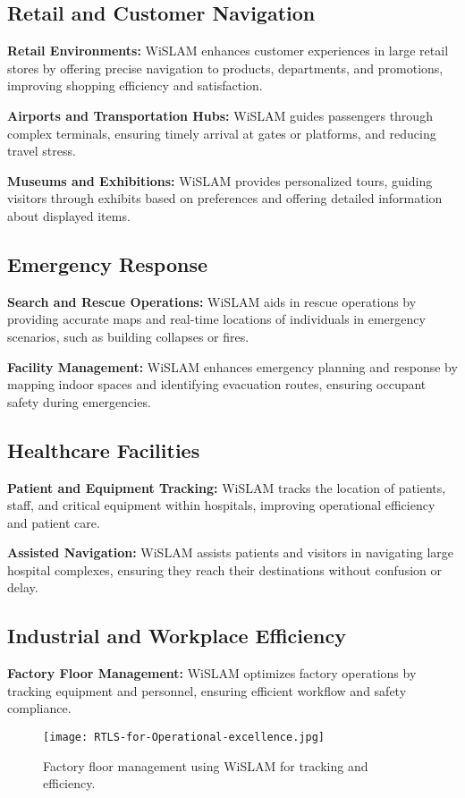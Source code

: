 \documentclass[
	a4paper, %
	11pt, %
	unnumberedsections, %
	twoside, %
]{LTJournalArticle}
\begin{document}
\subsection{Retail and Customer Navigation}
\textbf{Retail Environments:} WiSLAM enhances customer experiences in large retail stores by offering precise navigation to products, departments, and promotions, improving shopping efficiency and satisfaction.

\textbf{Airports and Transportation Hubs:} WiSLAM guides passengers through complex terminals, ensuring timely arrival at gates or platforms, and reducing travel stress.

\textbf{Museums and Exhibitions:} WiSLAM provides personalized tours, guiding visitors through exhibits based on preferences and offering detailed information about displayed items.

\subsection{Emergency Response}
\textbf{Search and Rescue Operations:} WiSLAM aids in rescue operations by providing accurate maps and real-time locations of individuals in emergency scenarios, such as building collapses or fires.

\textbf{Facility Management:} WiSLAM enhances emergency planning and response by mapping indoor spaces and identifying evacuation routes, ensuring occupant safety during emergencies.

\subsection{Healthcare Facilities}
\textbf{Patient and Equipment Tracking:} WiSLAM tracks the location of patients, staff, and critical equipment within hospitals, improving operational efficiency and patient care.

\textbf{Assisted Navigation:} WiSLAM assists patients and visitors in navigating large hospital complexes, ensuring they reach their destinations without confusion or delay.

\subsection{Industrial and Workplace Efficiency}
\textbf{Factory Floor Management:} WiSLAM optimizes factory operations by tracking equipment and personnel, ensuring efficient workflow and safety compliance.

\begin{figure}[h]
    \centering
    \texttt{[image: RTLS-for-Operational-excellence.jpg]}
    \caption{Factory floor management using WiSLAM for tracking and efficiency.}
    \label{fig:RTLS-for-Operational-excellence}
\end{figure}
\end{document}
